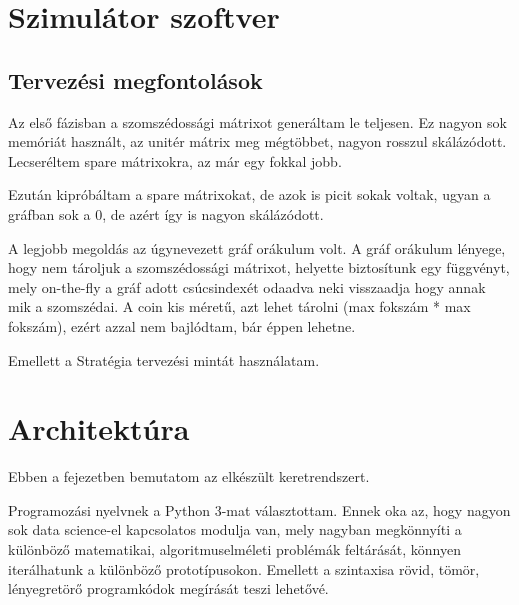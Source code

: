 \chapter{Szimulátor szoftver}


\section{Tervezési megfontolások}

Az első fázisban a szomszédossági mátrixot generáltam le teljesen. Ez nagyon sok memóriát használt, az unitér mátrix meg mégtöbbet, nagyon rosszul skálázódott. Lecseréltem spare mátrixokra, az már egy fokkal jobb.


Ezután kipróbáltam a spare mátrixokat, de azok is picit sokak voltak, ugyan a gráfban sok a 0, de azért
így is nagyon skálázódott.

A legjobb megoldás az úgynevezett gráf orákulum volt. A gráf orákulum lényege, hogy nem tároljuk a szomszédossági mátrixot, helyette biztosítunk egy függvényt, mely on-the-fly a gráf adott csúcsindexét odaadva neki visszaadja hogy annak mik a szomszédai. A coin kis méretű, azt lehet tárolni (max fokszám * max fokszám), ezért azzal nem bajlódtam, bár éppen lehetne.

Emellett a Stratégia tervezési mintát használatam.


\chapter{Architektúra}


Ebben a fejezetben bemutatom az elkészült keretrendszert.

Programozási nyelvnek a Python 3-mat választottam. Ennek oka az, hogy nagyon sok data science-el kapcsolatos modulja van, mely nagyban megkönnyíti a különböző matematikai, algoritmuselméleti problémák feltárását, könnyen iterálhatunk a különböző prototípusokon. Emellett a szintaxisa rövid, tömör, lényegretörő programkódok megírását teszi lehetővé.

